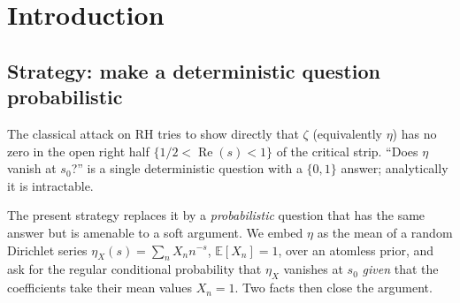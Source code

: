 \documentclass[11pt,a4paper]{article}
\theoremstyle{definition}
\newcommand{\Rea}{\operatorname{Re}}
\newcommand{\etaX}{\eta_X}
\begin{document}
\begin{abstract}
The probabilistic substrate is an instance of the \textbf{Kopperman/Mehler formalism}
used in the companion \(P\neq NP\) development: a separable Hilbert space, a decidable
dense skeleton of finite Dirichlet approximants, and an \emph{atomless} measure specified
by its mean and covariance. ``Choosing the measure is choosing the model.'' In Lean, the
probabilistic core \texttt{RcpEuler.lean} (the random series, the atomless prior, the rcp
kernel, the reciprocal contour convergence) is on disk and \texttt{sorry}-free for an
earlier radius-\(1\), Euler-product instance; the redesign of this paper --- radius \(2\),
general non-multiplicative series, and the transfer-equality bridge in place of the
arithmetical one --- is the current plan (\texttt{IMPLEMENTATION\_PLAN\_RCP.md}) and is
not yet on disk. The result is a \emph{verified reduction} of RH to the transfer equality
and Bagchi universality, not a complete proof.
\end{abstract}

\section{Introduction}

\subsection{Strategy: make a deterministic question probabilistic}

The classical attack on RH tries to show directly that \(\zeta\) (equivalently \(\eta\))
has no zero in the open right half \(\{1/2<\Rea(s)<1\}\) of the critical strip. ``Does
\(\eta\) vanish at \(s_0\)?'' is a single deterministic question with a \(\{0,1\}\)
answer; analytically it is intractable.

The present strategy replaces it by a \emph{probabilistic} question that has the same
answer but is amenable to a soft argument. We embed \(\eta\) as the mean of a random
Dirichlet series \(\etaX(s)=\sum_n X_n n^{-s}\), \(\mathbb{E}[X_n]=1\), over an atomless
prior, and ask for the regular conditional probability that \(\etaX\) vanishes at \(s_0\)
\emph{given} that the coefficients take their mean values \(X_n=1\). Two facts then close
the argument.
\end{document}

